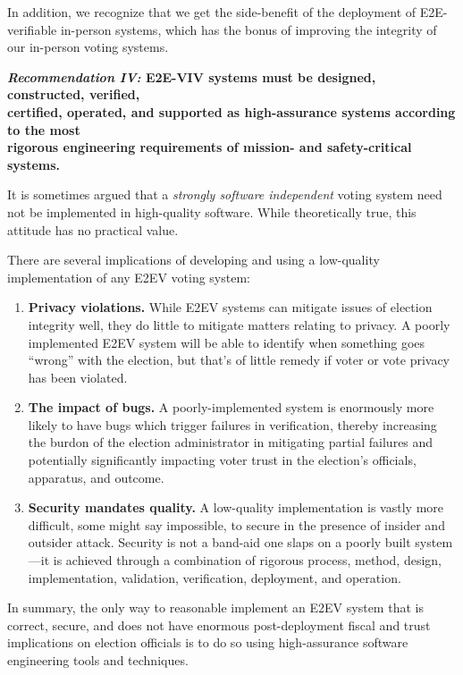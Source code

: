 In addition, we recognize that we get the side-benefit of the
deployment of E2E-verifiable in-person systems, which has the bonus of
improving the integrity of our in-person voting systems.

\begin{center}
  \textbf{\emph{Recommendation IV:} E2E-VIV systems must be designed,
    constructed, verified,\\
    certified, operated, and supported as high-assurance systems
    according to the most\\
    rigorous engineering requirements of mission- and safety-critical
    systems.}
\end{center}

It is sometimes argued that a \emph{strongly software independent}
voting system need not be implemented in high-quality software. While
theoretically true, this attitude has no practical value.

There are several implications of developing and using a low-quality
implementation of any E2EV voting system:
\begin{enumerate}
\item \textbf{Privacy violations. }While E2EV systems can mitigate
  issues of election integrity well, they do little to mitigate
  matters relating to privacy.  A poorly implemented E2EV system will
  be able to identify when something goes ``wrong'' with the election,
  but that's of little remedy if voter or vote privacy has been
  violated.
\item \textbf{The impact of bugs.} A poorly-implemented system is
  enormously more likely to have bugs which trigger failures in
  verification, thereby increasing the burdon of the election
  administrator in mitigating partial failures and potentially
  significantly impacting voter trust in the election's officials,
  apparatus, and outcome.
\item \textbf{Security mandates quality.} A low-quality implementation
  is vastly more difficult, some might say impossible, to secure in
  the presence of insider and outsider attack. Security is not a
  band-aid one slaps on a poorly built system---it is achieved through
  a combination of rigorous process, method, design, implementation,
  validation, verification, deployment, and operation.
\end{enumerate}

In summary, the only way to reasonable implement an E2EV system that
is correct, secure, and does not have enormous post-deployment fiscal
and trust implications on election officials is to do so using
high-assurance software engineering tools and techniques.

